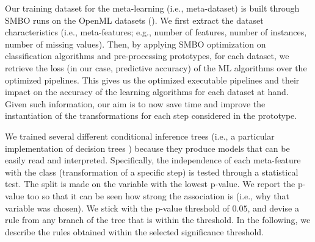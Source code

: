 \begin{example}
Our training dataset for the meta-learning (i.e., meta-dataset) is built through SMBO runs on the OpenML datasets ().
We first extract the dataset characteristics (i.e., meta-features; e.g., number of features, number of instances, number of missing values).
Then, by applying SMBO optimization on classification algorithms and pre-processing prototypes, for each dataset, we retrieve the loss (in our case, predictive accuracy) of the ML algorithms over the optimized pipelines.
This gives us the optimized executable pipelines and their impact on the accuracy of the learning algorithms for each dataset at hand.
Given such information, our aim is to now save time and improve the instantiation of the transformations for each step considered in the prototype.

We trained several different conditional inference trees (i.e., a particular implementation of decision trees \cite{ctree}) because they produce models that can be easily read and interpreted.
Specifically, the independence of each meta-feature with the class (transformation of a specific step) is tested through a statistical test.
The split is made on the variable with the lowest p-value.
We report the p-value too so that it can be seen how strong the association is (i.e., why that variable was chosen).
We stick with the p-value threshold of $0.05$, and devise a rule from any branch of the tree that is within the threshold.
In the following, we describe the rules obtained within the selected significance threshold.


\end{example}
